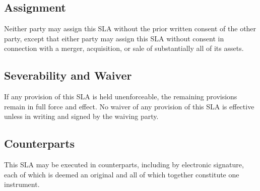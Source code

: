 \subsection{Assignment}
Neither party may assign this SLA without the prior written consent of the other party, except that either party may assign this SLA without consent in connection with a merger, acquisition, or sale of substantially all of its assets.

\subsection{Severability and Waiver}
If any provision of this SLA is held unenforceable, the remaining provisions remain in full force and effect. No waiver of any provision of this SLA is effective unless in writing and signed by the waiving party.

\subsection{Counterparts}
This SLA may be executed in counterparts, including by electronic signature, each of which is deemed an original and all of which together constitute one instrument.
